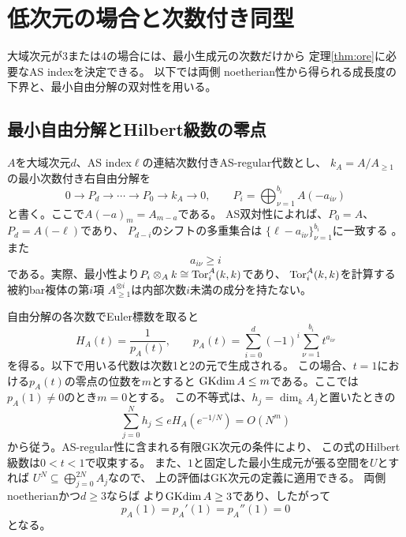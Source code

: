 \section{低次元の場合と次数付き同型}
\label{sec:lowdim}

大域次元が3または4の場合には、最小生成元の次数だけから
定理\ref{thm:ore}に必要なAS indexを決定できる。
以下では両側 noetherian性から得られる成長度の下界と、最小自由分解の双対性を用いる。

\subsection{最小自由分解とHilbert級数の零点}

$A$を大域次元$d$、AS index$\ell$の連結次数付きAS-regular代数とし、
$k_A=A/A_{\geq 1}$の最小次数付き右自由分解を
\[
  0\longrightarrow P_d\longrightarrow\cdots\longrightarrow P_0
  \longrightarrow k_A\longrightarrow0,
  \qquad
  P_i=\bigoplus_{\nu=1}^{b_i}A(-a_{i\nu})
\]
と書く。ここで$A(-a)_m=A_{m-a}$である。
AS双対性によれば、$P_0=A$、$P_d=A(-\ell)$であり、
$P_{d-i}$のシフトの多重集合は
$\{\ell-a_{i\nu}\}_{\nu=1}^{b_i}$に一致する
\cite[Lemma 1.1]{LPWZ}。
また
\begin{equation}
  a_{i\nu}\geq i
  \label{eq:lowdim-shift-bound}
\end{equation}
である。実際、最小性より$P_i\otimes_A k\cong\operatorname{Tor}_i^A(k,k)$であり、
$\operatorname{Tor}_i^A(k,k)$を計算する被約bar複体の第$i$項
$A_{\geq1}^{\otimes i}$は内部次数$i$未満の成分を持たない。

自由分解の各次数でEuler標数を取ると
\begin{equation}
  H_A(t)=\frac{1}{p_A(t)},
  \qquad
  p_A(t)=\sum_{i=0}^{d}(-1)^i\sum_{\nu=1}^{b_i}t^{a_{i\nu}}
  \label{eq:lowdim-euler}
\end{equation}
を得る。以下で用いる代数は次数1と2の元で生成される。
この場合、$t=1$における$p_A(t)$の零点の位数を$m$とすると
$\operatorname{GKdim} A\leq m$である。ここでは$p_A(1)\ne0$のとき$m=0$とする。
この不等式は、$h_j=\dim_k A_j$と置いたときの
\[
  \sum_{j=0}^{N}h_j
  \leq eH_A(e^{-1/N})=O(N^m)
\]
から従う。AS-regular性に含まれる有限GK次元の条件により、
この式のHilbert級数は$0<t<1$で収束する。
また、$1$と固定した最小生成元が張る空間を$U$とすれば
$U^N\subseteq\bigoplus_{j=0}^{2N}A_j$なので、
上の評価はGK次元の定義に適用できる。
両側 noetherianかつ$d\geq3$ならば
\cite[Lemma 1.2]{LPWZ}より$\operatorname{GKdim} A\geq3$であり、したがって
\begin{equation}
  p_A(1)=p_A'(1)=p_A''(1)=0
  \label{eq:lowdim-three-zeros}
\end{equation}
となる。

